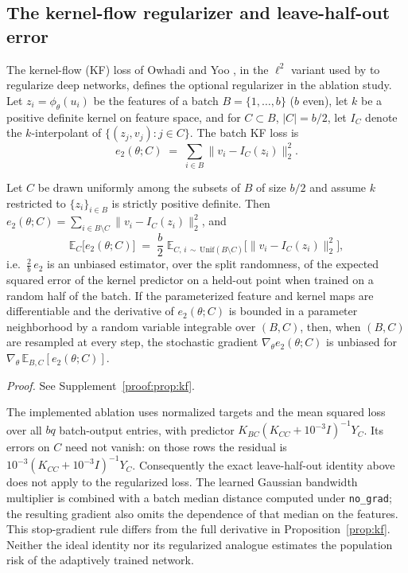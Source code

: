 \subsection{The kernel-flow regularizer and leave-half-out error}
\label{sec:theory-kf}

The kernel-flow (KF) loss of Owhadi and Yoo \citep{owhadi2019kernel}, in the
$\ell^2$ variant used by \citet{yoo2021deep} to regularize deep networks,
defines the optional regularizer in the ablation study. Let $z_i=\phi_\theta(u_i)$ be the features of a batch
$B=\{1,\dots,b\}$ ($b$ even), let $k$ be a positive definite kernel on feature
space, and for $C\subset B$, $|C|=b/2$, let $I_C$ denote the $k$-interpolant
of $\{(z_j,v_j):j\in C\}$. The batch KF loss is
\begin{equation}\label{eq:kf}
e_2(\theta;C)\;=\;\sum_{i\in B}\big\|v_i-I_C(z_i)\big\|_2^2 .
\end{equation}

\begin{proposition}\label{prop:kf}
Let $C$ be drawn uniformly among the subsets of $B$ of size $b/2$ and assume
$k$ restricted to $\{z_i\}_{i\in B}$ is strictly positive definite. Then
$e_2(\theta;C)=\sum_{i\in B\setminus C}\|v_i-I_C(z_i)\|_2^2$, and
\[
\mathbb E_C\big[e_2(\theta;C)\big]\;=\;\frac b2\;
\mathbb E_{C,\,i\,\sim\,\mathrm{Unif}(B\setminus C)}
\big[\big\|v_i-I_C(z_i)\big\|_2^2\big],
\]
i.e.\ $\tfrac2b\,e_2$ is an unbiased estimator, over the split randomness, of
the expected squared error of the kernel predictor on a held-out point
when trained on a random half of the batch. If the parameterized
feature and kernel maps are differentiable and the derivative of
$e_2(\theta;C)$ is bounded in a parameter neighborhood by a random variable
integrable over $(B,C)$, then, when $(B,C)$
are resampled at every step, the stochastic gradient
$\nabla_\theta e_2(\theta;C)$ is unbiased for
$\nabla_\theta\,\mathbb E_{B,C}[e_2(\theta;C)]$.
\end{proposition}
\noindent\emph{Proof.} See Supplement~\ref{proof:prop:kf}.


The implemented ablation uses normalized targets and the mean squared loss
over all $bq$ batch-output entries, with predictor
$K_{BC}(K_{CC}+10^{-3}I)^{-1}Y_C$. Its errors on $C$ need not vanish:
on those rows the residual is
$10^{-3}(K_{CC}+10^{-3}I)^{-1}Y_C$. Consequently the exact leave-half-out
identity above does not apply to the regularized loss. The learned Gaussian
bandwidth multiplier is combined with a batch median distance computed
under \texttt{no\_grad}; the resulting gradient also omits the dependence
of that median on the features. This stop-gradient rule differs from
the full derivative in Proposition~\ref{prop:kf}. Neither the ideal identity nor its regularized
analogue estimates the population risk of the adaptively trained network.


